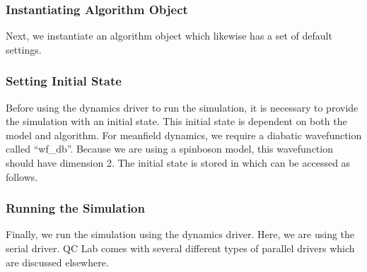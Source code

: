 \documentclass[letterpaper,10pt,english]{sphinxmanual}
\begin{document}
\subsubsection{Instantiating Algorithm Object}
\label{\detokenize{user_guide/quickstart/quickstart:instantiating-algorithm-object}}
\sphinxAtStartPar
Next, we instantiate an algorithm object which likewise has a set of default settings.

\begin{sphinxVerbatim}[commandchars=\\\{\}]
  
 
\end{sphinxVerbatim}


\subsubsection{Setting Initial State}
\label{\detokenize{user_guide/quickstart/quickstart:setting-initial-state}}
\sphinxAtStartPar
Before using the dynamics driver to run the simulation, it is necessary to provide the simulation with an initial state. This initial state is
dependent on both the model and algorithm. For mean\sphinxhyphen{}field dynamics, we require a diabatic wavefunction called “wf\_db”. Because we are using a spin\sphinxhyphen{}boson model,
this wavefunction should have dimension 2. The initial state is stored in  which can be accessed as follows.

\begin{sphinxVerbatim}[commandchars=\\\{\}]
  \PYG{p}{[} \PYG{p}{]} 
\end{sphinxVerbatim}


\subsubsection{Running the Simulation}
\label{\detokenize{user_guide/quickstart/quickstart:running-the-simulation}}
\sphinxAtStartPar
Finally, we run the simulation using the dynamics driver. Here, we are using the serial driver. QC Lab comes with several different types of parallel drivers which are discussed elsewhere.
\end{document}
